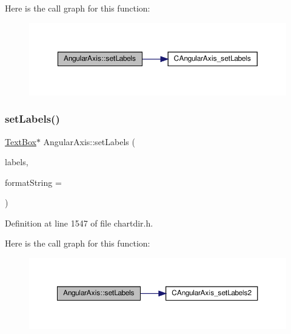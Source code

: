 Here is the call graph for this function\+:
\nopagebreak
\begin{figure}[H]
\begin{center}
\leavevmode
\includegraphics[width=350pt]{class_angular_axis_ae02899ce7abec02a96477811bd22c27e_cgraph}
\end{center}
\end{figure}
\mbox{\label{class_angular_axis_a3046d7450d5b1f01c00ae03668597bfb}} 
\subsubsection{\texorpdfstring{set\+Labels()}{setLabels()}\hspace{0.1cm}{\footnotesize\ttfamily [2/2]}}
{\footnotesize\ttfamily \hyperlink{class_text_box}{Text\+Box}$\ast$ Angular\+Axis\+::set\+Labels (\begin{DoxyParamCaption}\item[{\hyperlink{class_double_array}{Double\+Array}}]{labels,  }\item[{const char $\ast$}]{format\+String = {} }\end{DoxyParamCaption})\hspace{0.3cm}{\ttfamily [inline]}}



Definition at line 1547 of file chartdir.\+h.

Here is the call graph for this function\+:
\nopagebreak
\begin{figure}[H]
\begin{center}
\leavevmode
\includegraphics[width=350pt]{class_angular_axis_a3046d7450d5b1f01c00ae03668597bfb_cgraph}
\end{center}
\end{figure}
\mbox{\label{class_angular_axis_a7cdca2dfe1200fdf2664d269dac585ba}} 
